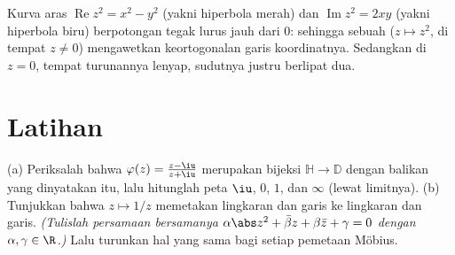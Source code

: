 \begin{omfigure}

{\small Kurva aras $\operatorname{Re}z^2 = x^2 - y^2$
(yakni hiperbola merah) dan $\operatorname{Im}z^2 = 2xy$ (yakni hiperbola
biru) berpotongan tegak lurus jauh dari $0$: sehingga sebuah
 ($z \mapsto z^2$, di tempat $z \neq 0$) mengawetkan
keortogonalan garis koordinatnya. Sedangkan di $z = 0$, tempat
turunannya lenyap, sudutnya justru berlipat dua.}
\end{omfigure}

\section{Latihan}

\begin{exercise}[$\star$]\label{exo:b3:conformal:1}
(a) Periksalah bahwa  $\varphi(z) = \frac{z -
\iu}{z + \iu}$ merupakan bijeksi $\mathbb H \to \mathbb D$ dengan
balikan yang dinyatakan itu, lalu hitunglah peta $\iu$, $0$,
$1$, dan $\infty$ (lewat limitnya).
(b) Tunjukkan bahwa $z \mapsto 1/z$ memetakan lingkaran dan garis ke
lingkaran dan garis. \emph{(Tulislah persamaan bersamanya
$\alpha\abs z^2 + \bar\beta z + \beta\bar z + \gamma = 0$
dengan $\alpha, \gamma \in \R$.)} Lalu turunkan hal yang sama bagi setiap pemetaan
Möbius.
\end{exercise}

